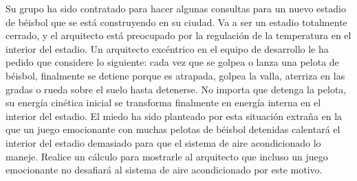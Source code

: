 \item Su grupo ha sido contratado para hacer algunas consultas para un nuevo estadio de béisbol que se está construyendo en su ciudad. Va a ser un estadio totalmente cerrado, y el arquitecto está preocupado por la regulación de la temperatura en el interior del estadio. Un arquitecto excéntrico en el equipo de desarrollo le ha pedido que considere lo siguiente: cada vez que se golpea o lanza una pelota de béisbol, finalmente se detiene porque es atrapada, golpea la valla, aterriza en las gradas o rueda sobre el suelo hasta detenerse. No importa que detenga la pelota, su energía cinética inicial se transforma finalmente en energía interna en el interior del estadio. El miedo ha sido planteado por esta situación extraña en la que un juego emocionante con muchas pelotas de béisbol detenidas calentará el interior del estadio demasiado para que el sistema de aire acondicionado lo maneje. Realice un cálculo para mostrarle al arquitecto que incluso un juego emocionante no desafiará al sistema de aire acondicionado por este motivo.
